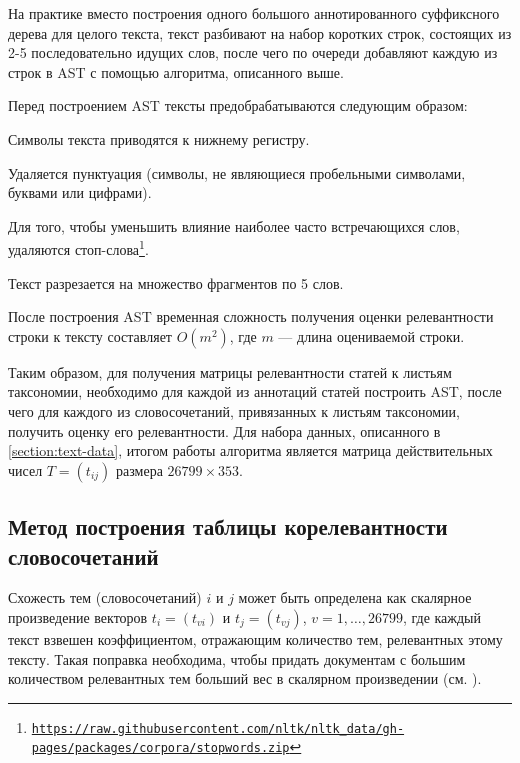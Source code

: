 \documentclass[12pt]{article}
\newenvironment{enumerate*}%
{\begin{enumerate}%
	\setlength{\itemsep}{0pt}%
	\setlength{\parskip}{0pt}}%
{\end{enumerate}}
\newcommand{\hrefl}[1] {\texttt{\href{#1}{#1}}}
\let\oldsubsection\subsection
\renewcommand{\subsection}{\clearpage\oldsubsection}
\begin{document}
На практике вместо построения одного большого аннотированного суффиксного дерева для целого текста, текст разбивают на набор коротких строк, состоящих из 2-5 последовательно идущих слов, после чего по очереди добавляют каждую из строк в AST с помощью алгоритма, описанного выше.

Перед построением AST тексты предобрабатываются следующим образом:
\begin{enumerate*}
	\item Символы текста приводятся к нижнему регистру.
	\item Удаляется пунктуация (символы, не являющиеся пробельными символами, буквами или цифрами).
	\item Для того, чтобы уменьшить влияние наиболее часто встречающихся слов, удаляются стоп-слова\footnote{\hrefl{https://raw.githubusercontent.com/nltk/nltk\_data/gh-pages/packages/corpora/stopwords.zip}}.
	\item Текст разрезается на множество фрагментов по 5 слов.
\end{enumerate*}

После построения AST временная сложность получения оценки релевантности строки к тексту составляет $O(m^2)$, где $m$ --- длина оцениваемой строки.

Таким образом, для получения матрицы релевантности статей к листьям таксономии, необходимо для каждой из аннотаций статей построить AST, после чего для каждого из словосочетаний, привязанных к листьям таксономии, получить оценку его релевантности. Для набора данных, описанного в \ref{section:text-data}, итогом работы алгоритма является матрица действительных чисел $T=(t_{ij})$ размера $26799 \times 353$.


\subsection{Метод построения таблицы корелевантности словосочетаний}

Схожесть тем (словосочетаний) $i$ и $j$ может быть определена как скалярное произведение векторов $t_i=(t_{vi})$ и $t_j=(t_{vj})$, $v=1,\ldots,26799$, где каждый текст взвешен коэффициентом, отражающим количество тем, релевантных этому тексту. Такая поправка необходима, чтобы придать документам с большим количеством релевантных тем больший вес в скалярном произведении (см. \cite{mirkin2010constructing}).
\end{document}
